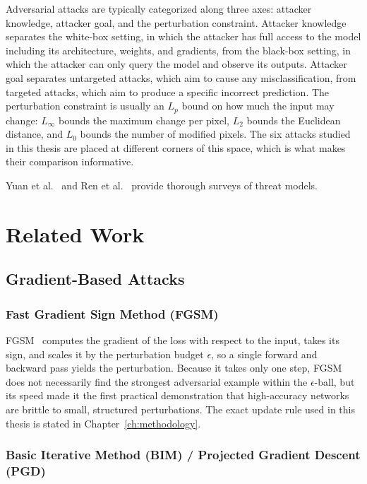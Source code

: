 Adversarial attacks are typically categorized along three axes: attacker knowledge, attacker goal, and the perturbation constraint. Attacker knowledge separates the white-box setting, in which the attacker has full access to the model including its architecture, weights, and gradients, from the black-box setting, in which the attacker can only query the model and observe its outputs. Attacker goal separates untargeted attacks, which aim to cause any misclassification, from targeted attacks, which aim to produce a specific incorrect prediction. The perturbation constraint is usually an $L_p$ bound on how much the input may change: $L_\infty$ bounds the maximum change per pixel, $L_2$ bounds the Euclidean distance, and $L_0$ bounds the number of modified pixels. The six attacks studied in this thesis are placed at different corners of this space, which is what makes their comparison informative.

Yuan et al.~\cite{yuan2019adversarial} and Ren et al.~\cite{ren2020adversarial} provide thorough surveys of threat models.

\section{Related Work}

\subsection{Gradient-Based Attacks}

\subsubsection{Fast Gradient Sign Method (FGSM)}

FGSM~\cite{goodfellow2015explaining} computes the gradient of the loss with respect to the input, takes its sign, and scales it by the perturbation budget $\epsilon$, so a single forward and backward pass yields the perturbation. Because it takes only one step, FGSM does not necessarily find the strongest adversarial example within the $\epsilon$-ball, but its speed made it the first practical demonstration that high-accuracy networks are brittle to small, structured perturbations. The exact update rule used in this thesis is stated in Chapter~\ref{ch:methodology}.

\subsubsection{Basic Iterative Method (BIM) / Projected Gradient Descent (PGD)}

